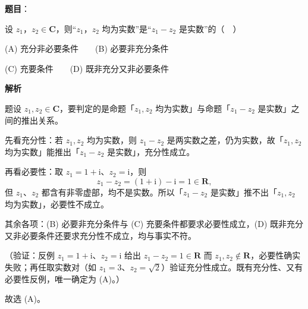 \begin{answer}

\textbf{题目}：

设 \(z_{1}\)，\(z_{2}\in\mathbf{C}\)，则“\(z_{1}\)，\(z_{2}\) 均为实数”是“\(z_{1}-z_{2}\) 是实数”的（　）

(A) 充分非必要条件　　(B) 必要非充分条件

(C) 充要条件　　(D) 既非充分又非必要条件

\textbf{解析}

题设 \(z_{1},z_{2}\in\mathbf{C}\)，要判定的是命题「\(z_{1},z_{2}\) 均为实数」与命题「\(z_{1}-z_{2}\) 是实数」之间的推出关系。

先看充分性：若 \(z_{1},z_{2}\) 均为实数，则 \(z_{1}-z_{2}\) 是两实数之差，仍为实数，故「\(z_{1},z_{2}\) 均为实数」能推出「\(z_{1}-z_{2}\) 是实数」，充分性成立。

再看必要性：取 \(z_{1}=1+\mathrm{i}\)、\(z_{2}=\mathrm{i}\)，则
\nopagebreak[4]
\[
z_{1}-z_{2}=(1+\mathrm{i})-\mathrm{i}=1\in\mathbf{R},
\]
但 \(z_{1}\)、\(z_{2}\) 都含有非零虚部，均不是实数。所以「\(z_{1}-z_{2}\) 是实数」推不出「\(z_{1},z_{2}\) 均为实数」，必要性不成立。

其余各项：(B) 必要非充分条件与 (C) 充要条件都要求必要性成立，(D) 既非充分又非必要条件还要求充分性不成立，均与事实不符。

（验证：反例 \(z_{1}=1+\mathrm{i}\)、\(z_{2}=\mathrm{i}\) 给出 \(z_{1}-z_{2}=1\in\mathbf{R}\) 而 \(z_{1},z_{2}\notin\mathbf{R}\)，必要性确实失败；再任取实数对（如 \(z_{1}=3\)、\(z_{2}=\sqrt{2}\)）验证充分性成立。既有充分性、又有必要性反例，唯一确定为 (A)。）

故选 (A)。


\end{answer}
